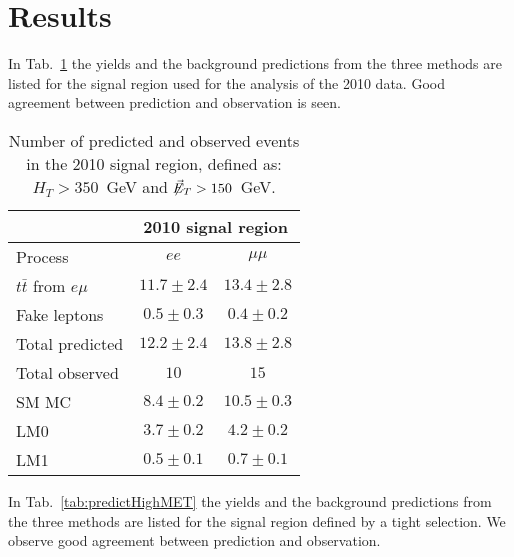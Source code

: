 \section{Results}\label{sec:results}

In Tab.~\ref{tab:predict2010} the yields and the background predictions
from the three methods are listed for the signal region used for the analysis
of the 2010 data. Good agreement between prediction and
observation is seen.

\begin{table}[hbt]
\begin{center}
\caption{\label{tab:predict2010}Number of predicted and observed events in the 2010 signal region, 
    defined as: $H_T > 350$~GeV and $\not\!\!\vec{E}_{T} > 150$~GeV.}
\begin{tabular}{l|cc}
\hline
                       & \multicolumn{2}{c}{2010 signal region}               \\
\hline 
Process                & $ee$          & $\mu\mu$        \\
\hline
$t\bar{t}$ from $e\mu$ & $11.7\pm 2.4$ & $13.4\pm 2.8$   \\
Fake leptons           & $0.5\pm 0.3$  & $0.4\pm0.2$                  \\
\hline
Total predicted        & $12.2\pm 2.4$ & $13.8 \pm 2.8$  \\
\hline\hline
Total observed         & $10$          & $15$          \\
\hline \hline
SM MC         & $8.4\pm 0.2$  & $10.5 \pm 0.3$    \\
LM0                    &  $3.7\pm0.2$  & $4.2\pm0.2$     \\
LM1                    &  $0.5\pm0.1$  & $0.7\pm0.1$     \\

\hline
\end{tabular}
\end{center}
\end{table}


In Tab.~\ref{tab:predictHighMET} the yields and the background predictions
from the three methods are listed for the signal region defined by a tight
\MET selection. We observe good agreement between prediction
and observation.

